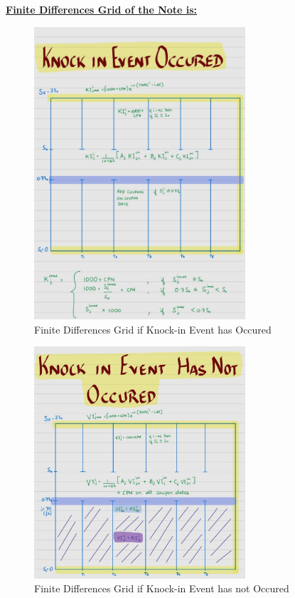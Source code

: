 \documentclass[12pt,a4paper]{article}
\begin{document}
\underline{\textbf{Finite Differences Grid of the Note is:}}
\begin{figure}[H]
    \centering
    \includegraphics[width=0.7\textwidth, height=0.4\textheight]{images_project_3/grid_ki.jpeg}
    \caption{Finite Differences Grid if Knock-in Event has Occured}
    \label{fig:yourlabel}
\end{figure}

\begin{figure}[H]
    \centering
    \includegraphics[width=0.7\textwidth, height=0.4\textheight]{images_project_3/grid_kin.jpeg}
    \caption{Finite Differences Grid if Knock-in Event has not Occured}
    \label{fig:yourlabel}
\end{figure}
\end{document}
